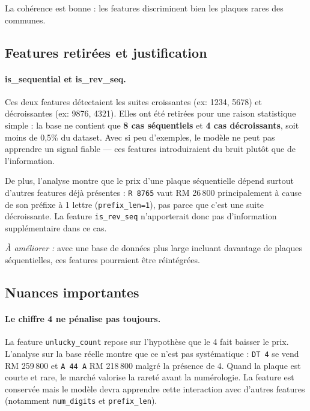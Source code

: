 \documentclass[12pt, a4paper]{article}
\begin{document}
La cohérence est bonne : les features discriminent bien les plaques rares des communes.

\subsection{Features retirées et justification}
\label{sec:features_retirees}

\paragraph{is\_sequential et is\_rev\_seq.}
Ces deux features détectaient les suites croissantes (ex: 1234, 5678) et décroissantes (ex: 9876, 4321). Elles ont été retirées pour une raison statistique simple : la base ne contient que \textbf{8 cas séquentiels} et \textbf{4 cas décroissants}, soit moins de 0,5\% du dataset. Avec si peu d'exemples, le modèle ne peut pas apprendre un signal fiable — ces features introduiraient du bruit plutôt que de l'information.

De plus, l'analyse montre que le prix d'une plaque séquentielle dépend surtout d'autres features déjà présentes : \texttt{R 8765} vaut RM 26\,800 principalement à cause de son préfixe à 1 lettre (\texttt{prefix\_len=1}), pas parce que c'est une suite décroissante. La feature \texttt{is\_rev\_seq} n'apporterait donc pas d'information supplémentaire dans ce cas.

\textit{À améliorer :} avec une base de données plus large incluant davantage de plaques séquentielles, ces features pourraient être réintégrées.

\subsection{Nuances importantes}
\label{sec:nuances}

\paragraph{Le chiffre 4 ne pénalise pas toujours.}
La feature \texttt{unlucky\_count} repose sur l'hypothèse que le 4 fait baisser le prix. L'analyse sur la base réelle montre que ce n'est pas systématique : \texttt{DT 4} se vend RM 259\,800 et \texttt{A 44 A} RM 218\,800 malgré la présence de 4. Quand la plaque est courte et rare, le marché valorise la rareté avant la numérologie. La feature est conservée mais le modèle devra apprendre cette interaction avec d'autres features (notamment \texttt{num\_digits} et \texttt{prefix\_len}).
\end{document}
